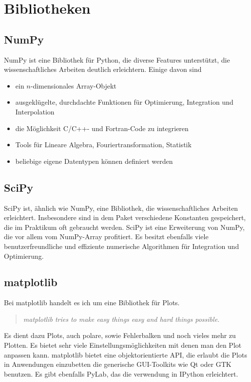 \section{Bibliotheken}
\subsection{NumPy}
NumPy ist eine Bibliothek für Python, die diverse Features unterstützt, die wissenschaftliches Arbeiten deutlich erleichtern.
Einige davon sind
\begin{itemize}
  \item ein $n$-dimensionales Array-Objekt
  \item ausgeklügelte, durchdachte Funktionen für Optimierung, Integration und Interpolation
  \item die Möglichkeit C/C++- und Fortran-Code zu integrieren
  \item Tools für Lineare Algebra, Fouriertransformation, Statistik
  \item beliebige eigene Datentypen können definiert werden
\end{itemize}

\subsection{SciPy}
SciPy ist, ähnlich wie NumPy, eine Bibliothek, die wissenschaftliches Arbeiten erleichtert.
Insbesondere sind in dem Paket verschiedene Konstanten gespeichert, die im Praktikum oft gebraucht werden.
SciPy ist eine Erweiterung von NumPy, die vor allem vom NumPy-Array profitiert.
Es besitzt ebenfalls viele benutzerfreundliche und effiziente numerische Algorithmen für Integration und Optimierung.

\subsection{matplotlib}
Bei matplotlib handelt es ich um eine Bibliothek für Plots.
\begin{quote}
  \textit{matplotlib tries to make easy things easy and hard things possible.}
\end{quote}
Es dient dazu Plots, auch polare, sowie Fehlerbalken und noch vieles mehr zu Plotten.
Es bietet sehr viele Einstellungsmöglichkeiten mit denen man den Plot anpassen kann.
matplotlib bietet eine objektorientierte API, die erlaubt die Plots in Anwendungen einzubetten die generische GUI-Toolkits wie Qt oder GTK benutzen.
Es gibt ebenfalls PyLab, das die verwendung in IPython erleichtert.

